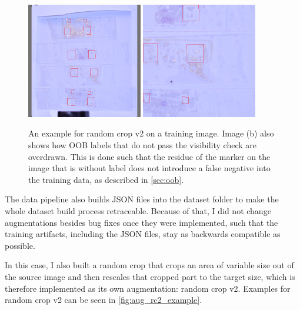 \documentclass[10pt]{book}
\newcommand{\figureref}[1]{\autoref{#1}}
\begin{document}
\begin{figure}
  \centering
     {\includegraphics[width=0.45\textwidth]{image/aug_rc2_before}}
     {\includegraphics[width=0.45\textwidth]{image/aug_rc2_after}}
  \caption{An example for random crop v2 on a training image. Image (b) also shows how \ac{OOB} labels that do not pass the visibility check are overdrawn. This is done such that the residue of the marker on the image that is without label does not introduce a false negative into the training data, as described in \autoref{sec:oob}.}
  \label{fig:aug_rc2_example}
\end{figure}

The data pipeline also builds \ac{JSON} files into the dataset folder to make the whole dataset build process retraceable. Because of that, I did not change augmentations besides bug fixes once they were implemented, such that the training artifacts, including the \ac{JSON} files, stay as backwards compatible as possible. 

In this case, I also built a random crop that crops an area of variable size out of the source image and then rescales that cropped part to the target size, which is therefore implemented as its own augmentation: random crop v2. Examples for random crop v2 can be seen in \figureref{fig:aug_rc2_example}. 
\end{document}
